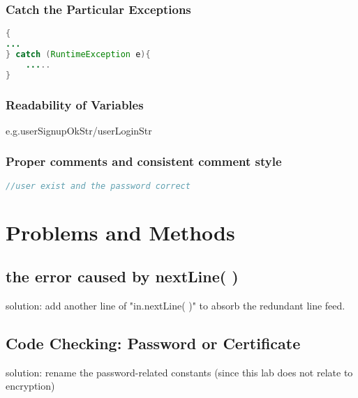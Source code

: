 \documentclass[./report.tex]{subfiles}
\begin{document}
  \subsubsection{Catch the Particular Exceptions }
  \begin{lstlisting}[language=java]
{
...
} catch (RuntimeException e){
	.....
}
\end{lstlisting}
  
    \subsubsection{Readability of Variables}
    \par e.g.userSignupOkStr/userLoginStr
    
    
 \subsubsection{Proper comments and consistent comment style}
   \begin{lstlisting}[language=java]
//user exist and the password correct
\end{lstlisting}   \section{Problems and Methods}
    \subsection{the error caused by nextLine( )}
    \par solution: add another line of "in.nextLine( )" to absorb the redundant line feed.
    \subsection{Code Checking: Password or Certificate }
    \par solution: rename the password-related constants (since this lab does not relate to encryption)
    
   

	
		
\end{document}
